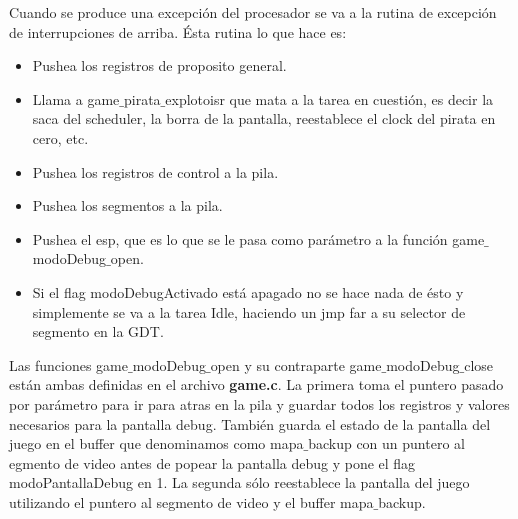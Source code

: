 Cuando se produce una excepción del procesador se va a la rutina de excepción de interrupciones de arriba.
Ésta rutina lo que hace es:
\begin{itemize}
\item Pushea los registros de proposito general.
\item Llama a game$\_$pirata$\_$explotoisr que mata a la tarea en cuestión, es decir la saca del scheduler, la borra de la pantalla, reestablece el clock del pirata en cero, etc.
\item Pushea los registros de control a la pila.
\item Pushea los segmentos a la pila.
\item Pushea el esp, que es lo que se le pasa como parámetro a la función game$\_$modoDebug$\_$open.
\item Si el flag modoDebugActivado está apagado no se hace nada de ésto y simplemente se va a la tarea Idle, haciendo un jmp far a su selector de segmento en la GDT. 
\end{itemize}

Las funciones game$\_$modoDebug$\_$open y su contraparte game$\_$modoDebug$\_$close están ambas definidas en el archivo \textbf{game.c}. La primera toma el puntero pasado por parámetro para ir para atras en la pila y guardar todos los registros y valores necesarios para la pantalla debug. También guarda el estado de la pantalla del juego en el buffer que denominamos como mapa$\_$backup  con un puntero al egmento de video antes de popear la pantalla debug y pone el flag modoPantallaDebug en 1.
La segunda sólo reestablece la pantalla del juego utilizando el puntero al segmento de video y el buffer mapa$\_$backup.

